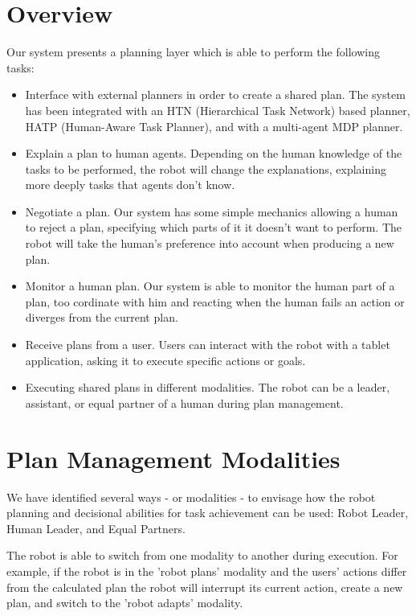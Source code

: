 \section{Overview}
Our system presents a planning layer which is able to perform the following tasks:
\begin{itemize}
	\item Interface with external planners in order to create a shared plan. The system has been integrated with an HTN (Hierarchical Task Network) based planner, HATP (Human-Aware Task Planner), and with a multi-agent MDP planner.
	\item Explain a plan to human agents. Depending on the human knowledge of the tasks to be performed, the robot will change the explanations, explaining more deeply tasks that agents don't know.
	\item Negotiate a plan. Our system has some simple mechanics allowing a human to reject a plan, specifying which parts of it it doesn't want to perform. The robot will take the human's preference into account when producing a new plan.
	\item Monitor a human plan. Our system is able to monitor the human part of a plan, too cordinate with him and reacting when the human fails an action or diverges from the current plan.
	\item Receive plans from a user. Users can interact with the robot with a tablet application, asking it to execute specific actions or goals.
	\item Executing shared plans in different modalities. The robot can be a leader, assistant, or equal partner of a human during plan management.
\end{itemize}

\section{Plan Management Modalities}
We have identified several ways - or modalities - to envisage how the robot planning and decisional abilities
for task achievement can be used: Robot Leader, Human Leader, and Equal Partners.

The robot is able to switch from one modality to another during
execution. For example, if the robot is in the 'robot plans' modality and the users' actions differ from the calculated plan the robot will
interrupt its current action, create a new plan, and switch to the 'robot adapts' modality.  


